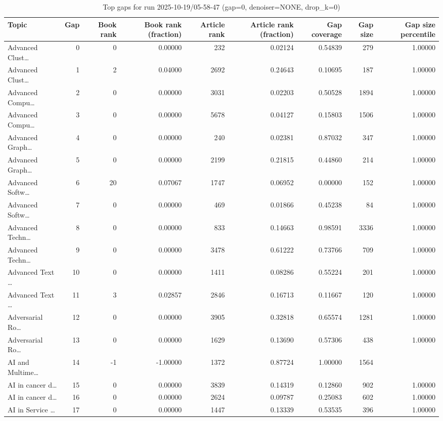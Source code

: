\begin{table}
\caption{Top gaps for run 2025-10-19/05-58-47 (gap=0, denoiser=NONE, drop\_k=0)}
\label{tab:best_run_gap0_2025_10_19_05_58_47}
\begin{tabular}{lrrrrrrrr}
\toprule
Topic & Gap & Book rank & Book rank (fraction) & Article rank & Article rank (fraction) & Gap coverage & Gap size & Gap size percentile \\
\midrule
Advanced Clust… & 0 & 0 & 0.00000 & 232 & 0.02124 & 0.54839 & 279 & 1.00000 \\
Advanced Clust… & 1 & 2 & 0.04000 & 2692 & 0.24643 & 0.10695 & 187 & 1.00000 \\
Advanced Compu… & 2 & 0 & 0.00000 & 3031 & 0.02203 & 0.50528 & 1894 & 1.00000 \\
Advanced Compu… & 3 & 0 & 0.00000 & 5678 & 0.04127 & 0.15803 & 1506 & 1.00000 \\
Advanced Graph… & 4 & 0 & 0.00000 & 240 & 0.02381 & 0.87032 & 347 & 1.00000 \\
Advanced Graph… & 5 & 0 & 0.00000 & 2199 & 0.21815 & 0.44860 & 214 & 1.00000 \\
Advanced Softw… & 6 & 20 & 0.07067 & 1747 & 0.06952 & 0.00000 & 152 & 1.00000 \\
Advanced Softw… & 7 & 0 & 0.00000 & 469 & 0.01866 & 0.45238 & 84 & 1.00000 \\
Advanced Techn… & 8 & 0 & 0.00000 & 833 & 0.14663 & 0.98591 & 3336 & 1.00000 \\
Advanced Techn… & 9 & 0 & 0.00000 & 3478 & 0.61222 & 0.73766 & 709 & 1.00000 \\
Advanced Text … & 10 & 0 & 0.00000 & 1411 & 0.08286 & 0.55224 & 201 & 1.00000 \\
Advanced Text … & 11 & 3 & 0.02857 & 2846 & 0.16713 & 0.11667 & 120 & 1.00000 \\
Adversarial Ro… & 12 & 0 & 0.00000 & 3905 & 0.32818 & 0.65574 & 1281 & 1.00000 \\
Adversarial Ro… & 13 & 0 & 0.00000 & 1629 & 0.13690 & 0.57306 & 438 & 1.00000 \\
AI and Multime… & 14 & -1 & -1.00000 & 1372 & 0.87724 & 1.00000 & 1564 &  \\
AI in cancer d… & 15 & 0 & 0.00000 & 3839 & 0.14319 & 0.12860 & 902 & 1.00000 \\
AI in cancer d… & 16 & 0 & 0.00000 & 2624 & 0.09787 & 0.25083 & 602 & 1.00000 \\
AI in Service … & 17 & 0 & 0.00000 & 1447 & 0.13339 & 0.53535 & 396 & 1.00000 \\

\end{tabular}
\end{table}
